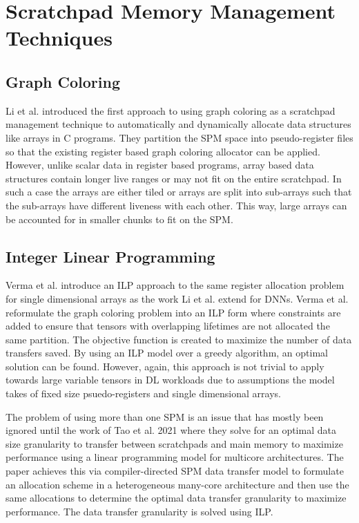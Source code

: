 \section{Scratchpad Memory Management Techniques}

\subsection{Graph Coloring}
Li et al. \cite{graphColoring} introduced the first approach to using graph coloring
as a scratchpad management technique to automatically and dynamically allocate data
structures like arrays in C programs. They partition the SPM space into pseudo-register
files so that the existing register based graph coloring allocator can be applied.
However, unlike scalar data in register based programs, array based data structures
contain longer live ranges or may not fit on the entire scratchpad. In such a case
the arrays are either tiled or arrays are split into sub-arrays such that the 
sub-arrays have different liveness with each other. This way, large arrays can
be accounted for in smaller chunks to fit on the SPM. 

\subsection{Integer Linear Programming}
Verma et al. \cite{verma} introduce an ILP approach to the same register
allocation problem for single dimensional arrays as the work Li et al. extend
for DNNs. Verma et al. reformulate the graph coloring problem into an ILP form
where constraints are added to ensure that tensors with overlapping lifetimes
are not allocated the same partition. The objective function is created to
maximize the number of data transfers saved. By using an ILP model over a
greedy algorithm, an optimal solution can be found. However, again, this
approach is not trivial to apply towards large variable tensors in DL workloads
due to assumptions the model takes of fixed size psuedo-registers and single
dimensional arrays.

The problem of using more than one SPM is an issue that has mostly been ignored
until the work of Tao et al. 2021 \cite{manyCore} where they solve for an optimal data size
granularity to transfer between scratchpads and main memory to maximize performance
using a linear programming model for multicore architectures. The paper achieves
this via compiler-directed SPM data transfer model to formulate an allocation
scheme in a heterogeneous many-core architecture and then use the same allocations
to determine the optimal data transfer granularity to maximize performance.
The data transfer granularity is solved using ILP.

